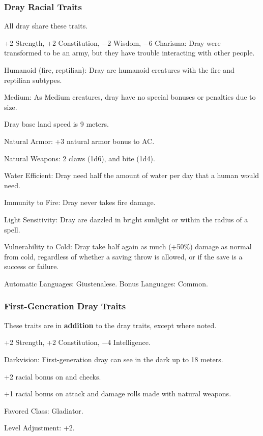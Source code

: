 \subsubsection{Dray Racial Traits}
All dray share these traits.
\begin{itemize*}
    \item +2 Strength, +2 Constitution, $-2$ Wisdom, $-6$ Charisma: Dray were transformed to be an army, but they have trouble interacting with other people.
    \item Humanoid (fire, reptilian): Dray are humanoid creatures with the fire and reptilian subtypes.
    \item Medium: As Medium creatures, dray have no special bonuses or penalties due to size.
    \item Dray base land speed is 9 meters.

    \item Natural Armor: +3 natural armor bonus to AC.
    \item Natural Weapons: 2 claws (1d6), and bite (1d4).

    \item Water Efficient: Dray need half the amount of water per day that a human would need.

    \item Immunity to Fire: Dray never takes fire damage.
    \item Light Sensitivity: Dray are dazzled in bright sunlight or within the radius of a  spell.
    \item Vulnerability to Cold: Dray take half again as much (+50\%) damage as normal from cold, regardless of whether a saving throw is allowed, or if the save is a success or failure.

    \item Automatic Languages: Giustenalese. Bonus Languages: Common.
\end{itemize*}

\subsubsection{First-Generation Dray Traits}
These traits are in \textbf{addition} to the dray traits, except where noted.
\begin{itemize*}
    \item +2 Strength, +2 Constitution, $-4$ Intelligence.
    \item Darkvision: First-generation dray can see in the dark up to 18 meters.
    \item +2 racial bonus on  and  checks.
    \item +1 racial bonus on attack and damage rolls made with natural weapons.
    \item Favored Class: Gladiator.
    \item Level Adjustment: +2.
\end{itemize*}

